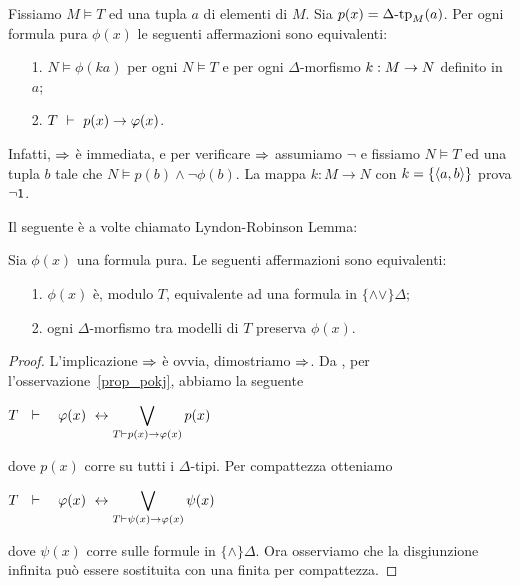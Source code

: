 \begin{remark}\label{prop_pokj}
Fissiamo $M\models T$ ed una tupla $a$ di elementi di $M$. Sia $p(x)=\Delta\mbox{-}\textrm{tp}_M(a)$. Per ogni formula pura $\phi(x)$ le seguenti affermazioni sono equivalenti:
\begin{itemize}
\item[1.] $N\models\phi(ka)$ per ogni $N\models T$ e per ogni $\Delta$-morfismo $k:M\rightarrow N$ definito in $a$;
\item[2.] $T\ \proves\  p(x)\imp\phi(x)$.
\end{itemize}
Infatti, $\Rightarrow$ \`e immediata, e per verificare $\Rightarrow$ 
assumiamo $\neg$ e fissiamo $N\models T$ ed una tupla $b$ tale che $N\models p(b)\wedge\neg\phi(b)$. La mappa $k:M\to N$ con $k=\{\langle a,b\rangle\}$ prova $\neg\textsf{\small 1}$.\QED
\end{remark}

Il seguente \`e a volte chiamato Lyndon-Robinson Lemma: 

\begin{theorem}\label{qfdefinability}
Sia $\phi(x)$ una formula pura. Le seguenti affermazioni sono equivalenti:
\begin{itemize}
\item[1.] $\phi(x)$ \`e, modulo $T$, equivalente ad una formula in $\{\mathord\wedge\!\mathord\vee\}\Delta$;
\item[2.] ogni $\Delta$-morfismo tra modelli di $T$ preserva $\phi(x)$.
\end{itemize}
\end{theorem}
\begin{proof} L'implicazione $\Rightarrow$ \`e ovvia, dimostriamo $\Rightarrow$. Da , per l'osservazione~\ref{prop_pokj}, abbiamo la seguente

\hfil$\displaystyle T\ \ \proves\ \ \ \phi(x)\ \iff\bigvee_{T\proves p(x)\imp\phi(x)} p(x)$

dove $p(x)$ corre su tutti i $\Delta$-tipi. Per compattezza otteniamo

\hfil$\displaystyle T\ \ \proves\ \ \ \phi(x)\ \iff\bigvee_{T\proves\psi(x)\imp\phi(x)} \psi(x)$

dove $\psi(x)$ corre sulle formule in $\{\wedge\}\Delta$. Ora osserviamo che la disgiunzione infinita pu\`o essere sostituita con una finita per compattezza.
\end{proof}
















